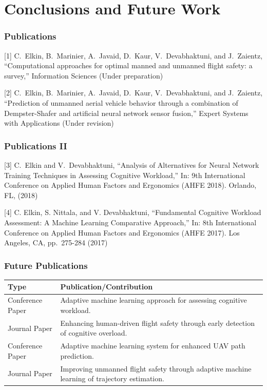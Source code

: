 \documentclass{beamer}
\begin{document}
\section{Conclusions and Future Work}

\begin{frame}
\frametitle{Publications}
[1] C.~Elkin, B.~Marinier, A.~Javaid, D.~Kaur, V.~Devabhaktuni, and J.~Zaientz, ``Computational approaches for optimal manned and unmanned flight safety: a survey,'' Information Sciences (Under preparation)

[2] C.~Elkin, B.~Marinier, A.~Javaid, D.~Kaur, V.~Devabhaktuni, and J.~Zaientz, ``Prediction of unmanned aerial vehicle behavior through a combination of Dempster-Shafer and artificial neural network sensor
fusion,'' Expert Systems with Applications (Under revision) 
\end{frame}

\begin{frame}
\frametitle{Publications II}
[3] C.~Elkin and V.~Devabhaktuni, ``Analysis of Alternatives for Neural Network Training Techniques in Assessing Cognitive Workload,'' In: 9th International Conference on Applied Human Factors and Ergonomics
(AHFE 2018). Orlando, FL, (2018)

[4] C. Elkin, S. Nittala, and V. Devabhaktuni, ``Fundamental Cognitive Workload Assessment: A Machine Learning Comparative Approach,'' In: 8th International Conference on Applied Human Factors and Ergonomics (AHFE 2017). Los Angeles, CA, pp.~275-284 (2017)
\end{frame}

\begin{frame}
\frametitle{Future Publications}
\begin{table}[!t]
\renewcommand{\arraystretch}{1.3}
\label{publications}
\centering
\resizebox{\textwidth}{!}
{\begin{tabular}{L{3.5cm} L{9.5cm}}
\toprule
Type & Publication/Contribution \\ \midrule
Conference Paper & Adaptive machine learning approach for assessing cognitive workload. \\
Journal Paper & Enhancing human-driven flight safety through early detection of cognitive overload. \\
Conference Paper & Adaptive machine learning system for enhanced UAV path prediction. \\
Journal Paper & Improving unmanned flight safety through adaptive machine learning of trajectory estimation. \\
\bottomrule
\end{tabular}}
\end{table}
\end{frame}
\end{document}
